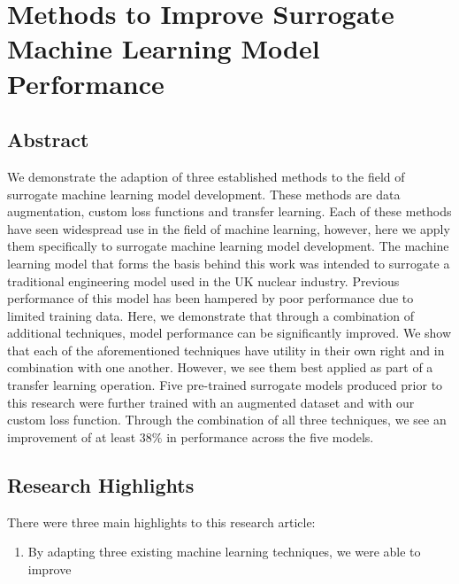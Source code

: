 \chapter[Methods to Improve Surrogate ML Models]{Methods to Improve Surrogate Machine Learning Model Performance}
\label{cha:Improve}

\section{Abstract}

We demonstrate the adaption of three established methods to the field of surrogate machine learning model development. These methods are data augmentation, custom loss functions and transfer learning. Each of these methods have seen widespread use in the field of machine learning, however, here we apply them specifically to surrogate machine learning model development. The machine learning model that forms the basis behind this work was intended to surrogate a traditional engineering model used in the UK nuclear industry. Previous performance of this model has been hampered by poor performance due to limited training data. Here, we demonstrate that through a combination of additional techniques, model performance can be significantly improved. We show that each of the aforementioned techniques have utility in their own right and in combination with one another. However, we see them best applied as part of a transfer learning operation. Five pre-trained surrogate models produced prior to this research were further trained with an augmented dataset and with our custom loss function. Through the combination of all three techniques, we see an improvement of at least $38\%$ in performance across the five models.

\section{Research Highlights}

There were three main highlights to this research article:

\begin{enumerate}
	
	\item By adapting three existing machine learning techniques, we were able to improve 
	
\end{enumerate}
